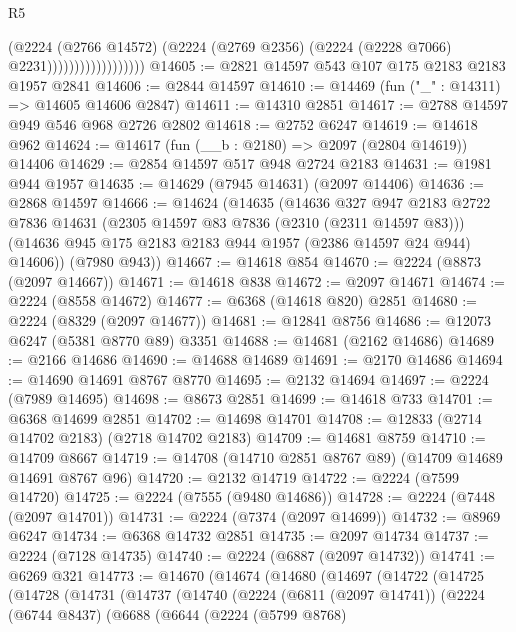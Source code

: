 \begin{lexlean}{R5}
\begin{coremodule}
                                  (@2224
                                    (@2766 @14572)
                                    (@2224
                                      (@2769 @2356)
                                      (@2224 (@2228 @7066) @2231))))))))))))))))))
@14605 := @2821 @14597 @543 @107 @175 @2183 @2183 @1957 @2841
@14606 := @2844 @14597
@14610 := @14469 (fun ("_" : @14311) => @14605 @14606 @2847)
@14611 := @14310 @2851
@14617 := @2788 @14597 @949 @546 @968 @2726 @2802
@14618 := @2752 @6247
@14619 := @14618 @962
@14624 := @14617 (fun (__b : @2180) => @2097 (@2804 @14619)) @14406
@14629 := @2854 @14597 @517 @948 @2724 @2183
@14631 := @1981 @944 @1957
@14635 := @14629 (@7945 @14631) (@2097 @14406)
@14636 := @2868 @14597
@14666 := @14624
    (@14635
      (@14636
        @327
        @947
        @2183
        @2722
        @7836
        @14631
        (@2305 @14597 @83 @7836 (@2310 (@2311 @14597 @83)))
        (@14636 @945 @175 @2183 @2183 @944 @1957 (@2386 @14597 @24 @944) @14606))
      (@7980 @943))
@14667 := @14618 @854
@14670 := @2224 (@8873 (@2097 @14667))
@14671 := @14618 @838
@14672 := @2097 @14671
@14674 := @2224 (@8558 @14672)
@14677 := @6368 (@14618 @820) @2851
@14680 := @2224 (@8329 (@2097 @14677))
@14681 := @12841 @8756
@14686 := @12073 @6247 (@5381 @8770 @89) @3351
@14688 := @14681 (@2162 @14686)
@14689 := @2166 @14686
@14690 := @14688 @14689
@14691 := @2170 @14686
@14694 := @14690 @14691 @8767 @8770
@14695 := @2132 @14694
@14697 := @2224 (@7989 @14695)
@14698 := @8673 @2851
@14699 := @14618 @733
@14701 := @6368 @14699 @2851
@14702 := @14698 @14701
@14708 := @12833 (@2714 @14702 @2183) (@2718 @14702 @2183)
@14709 := @14681 @8759
@14710 := @14709 @8667
@14719 := @14708 (@14710 @2851 @8767 @89) (@14709 @14689 @14691 @8767 @96)
@14720 := @2132 @14719
@14722 := @2224 (@7599 @14720)
@14725 := @2224 (@7555 (@9480 @14686))
@14728 := @2224 (@7448 (@2097 @14701))
@14731 := @2224 (@7374 (@2097 @14699))
@14732 := @8969 @6247
@14734 := @6368 @14732 @2851
@14735 := @2097 @14734
@14737 := @2224 (@7128 @14735)
@14740 := @2224 (@6887 (@2097 @14732))
@14741 := @6269 @321
@14773 := @14670
    (@14674
      (@14680
        (@14697
          (@14722
            (@14725
              (@14728
                (@14731
                  (@14737
                    (@14740
                      (@2224
                        (@6811 (@2097 @14741))
                        (@2224
                          (@6744 @8437)
                          (@6688
                            (@6644
                              (@2224
                                (@5799 @8768)

\end{coremodule}
\end{lexlean}
